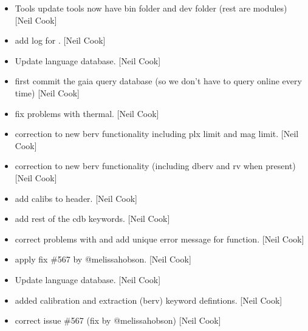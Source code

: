\documentclass[a4paper,10pt,english]{report}
\begin{document}
\begin{itemize}
\item {} 
Tools \sphinxhyphen{} update tools now have bin folder and dev folder (rest are
modules) {[}Neil Cook{]}

\item {} 
 \sphinxhyphen{} add log for . {[}Neil Cook{]}

\item {} 
Update language database. {[}Neil Cook{]}

\item {} 
 \sphinxhyphen{} first commit \sphinxhyphen{} the gaia query database (so we
don’t have to query online every time) {[}Neil Cook{]}

\item {} 
 \sphinxhyphen{} fix problems with thermal. {[}Neil Cook{]}

\item {} 
 \sphinxhyphen{} correction to new berv functionality
including plx limit and mag limit. {[}Neil Cook{]}

\item {} 
 \sphinxhyphen{} correction to new berv functionality
(including dberv and rv when present) {[}Neil Cook{]}

\item {} 
 \sphinxhyphen{} add calibs to header. {[}Neil Cook{]}

\item {} 
 \sphinxhyphen{} add rest of the cdb keywords. {[}Neil Cook{]}

\item {} 
 \sphinxhyphen{} correct problems with  and add unique
error message for  function. {[}Neil Cook{]}

\item {} 
 \sphinxhyphen{} apply fix \#567 by @melissa\sphinxhyphen{}hobson. {[}Neil Cook{]}

\item {} 
Update language database. {[}Neil Cook{]}

\item {} 
 \sphinxhyphen{} added calibration and extraction (berv) keyword
defintions. {[}Neil Cook{]}

\item {} 
 \sphinxhyphen{} correct issue \#567 (fix by @melissa\sphinxhyphen{}hobson) {[}Neil
Cook{]}

\end{itemize}
\end{document}
